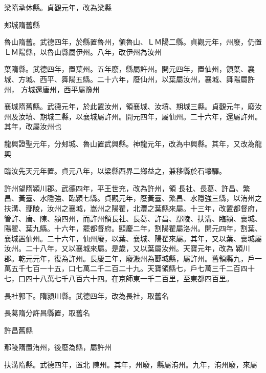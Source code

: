 \begin{pinyinscope}
 梁隋承休縣。貞觀元年，改為梁縣



 郟城隋舊縣



 魯山隋舊。武德四年，於縣置魯州，領魯山、ＬＭ陽二縣。貞觀元年，州廢，仍置ＬＭ陽縣，以魯山縣屬伊州。八年，改伊州為汝州



 葉隋縣。武德四年，置葉州。五年廢，縣屬許州。開元四年，置仙州，領葉、襄城、方城、西平、舞陽五縣。二十六年，廢仙州，以葉屬汝州，襄城、舞陽屬許州，
 方城還唐州，西平屬豫州



 襄城隋舊縣。武德元年，於此置汝州，領襄城、汝墳、期城三縣。貞觀元年，廢汝州及汝墳、期城二縣，以襄城屬許州。開元四年，屬仙州。二十六年，還屬許州。其年，改屬汝州也



 龍興證聖元年，分郟城、魯山置武興縣。神龍元年，改為中興縣。其年，又改為龍興



 臨汝先天元年置。貞元八年，以梁縣西界二鄉益之，兼移縣於石壕驛。



 許州望隋潁川郡。武德四年，平王世充，改為許州，領
 長社、長葛、許昌、繁昌、黃臺、水隱強、臨潁七縣。貞觀元年，廢黃臺、繁昌、水隱強三縣，以洧州之扶溝、鄢陵，汝州之襄城，嵩州之陽翟，北灃之葉縣來屬。十三年，改置都督府，管許、唐、陳、潁四州，而許州領長社、長葛、許昌、鄢陵、扶溝、臨潁、襄城、陽翟、葉九縣。十六年，罷都督府。顯慶二年，割陽翟屬洛州。開元四年，割葉、襄城置仙州。二十六年，仙州廢，以葉、襄城、陽翟來屬。其年，又以葉、襄城屬汝州。二十八年，又以襄城來屬。是歲，又以葉屬汝州。天寶元年，改為
 潁川郡。乾元元年，復為許州。長慶三年，廢溵州為郾城縣，屬許州。舊領縣九，戶一萬五千七百一十五，口七萬二千二百二十九。天寶領縣七，戶七萬三千二百四十七，口四十八萬七千八百六十四。在京師東一千二百里，至東都四百里。



 長社郭下。隋潁川縣。武德四年，改為長社，取舊名



 長葛隋分許昌縣置，取舊名



 許昌舊縣



 鄢陵隋置洧州，後廢為縣，屬許州



 扶溝隋縣。武德四年，置北
 陳州。其年，州廢，縣屬洧州。九年，洧州廢，來屬




\end{pinyinscope}
